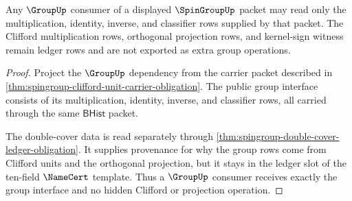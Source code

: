\begin{theorem}
\label{thm:spingroup-group-interface-boundary}
Any $\GroupUp$ consumer of a displayed $\SpinGroupUp$ packet may read only the
multiplication, identity, inverse, and classifier rows supplied by that packet.
The Clifford multiplication rows, orthogonal projection rows, and kernel-sign
witness remain ledger rows and are not exported as extra group operations.
\end{theorem}
\begin{proof}
Project the $\GroupUp$ dependency from the carrier packet described in
\autoref{thm:spingroup-clifford-unit-carrier-obligation}. The public group
interface consists of its multiplication, identity, inverse, and classifier
rows, all carried through the same $\mathsf{BHist}$ packet.

The double-cover data is read separately through
\autoref{thm:spingroup-double-cover-ledger-obligation}. It supplies provenance
for why the group rows come from Clifford units and the orthogonal projection,
but it stays in the ledger slot of the ten-field $\NameCert$ template. Thus a
$\GroupUp$ consumer receives exactly the group interface and no hidden Clifford
or projection operation.
\end{proof}
